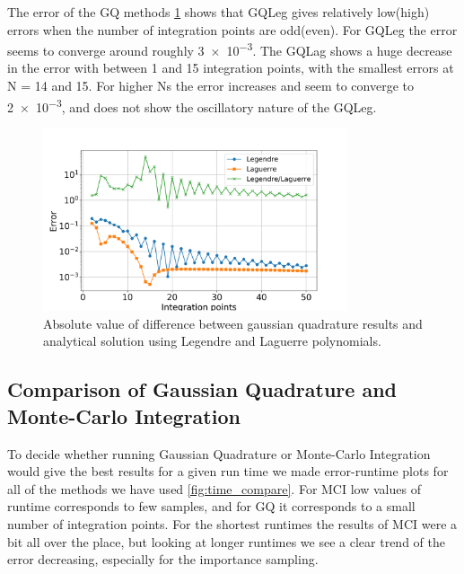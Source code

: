 The error of the GQ methods \cref{fig:gauss_error} shows that GQLeg gives
relatively low(high) errors when the number of integration points are odd(even).
For GQLeg the error seems to converge around roughly \num{ 3e-3}. The GQLag shows
a huge decrease in the error with between 1 and 15 integration points, with
the smallest errors at N = 14 and 15. For higher Ns the error
increases and seem to converge to \num{2e-3}, and does not show the oscillatory
nature of the GQLeg.

\begin{figure}[H]
  \centering
  \includegraphics[width=0.8\textwidth]{../figures/gauss_error.png}
  \caption{Absolute value of difference between gaussian quadrature results and analytical
  solution using Legendre and Laguerre polynomials.}

  \label{fig:gauss_error}
\end{figure}


\subsection{Comparison of Gaussian Quadrature and Monte-Carlo Integration}

To decide whether running Gaussian Quadrature or Monte-Carlo Integration would
give the best results for a given run time we made error-runtime plots for all
of the methods we have used \cref{fig:time_compare}. For MCI low values of runtime
corresponds to few samples, and for GQ it corresponds to a small number of integration points.
For the shortest runtimes the results of MCI were a bit all over the place, but
looking at longer runtimes we see a clear trend of the error decreasing, especially
for the importance sampling.


